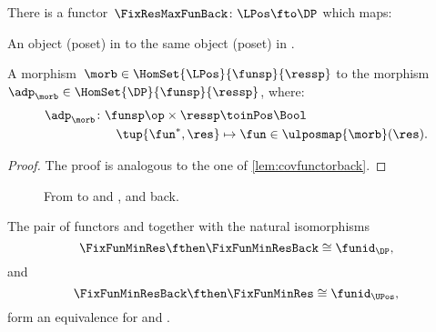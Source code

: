 \begin{lemma}
\label{lem:cofunctorback}
There is a functor~$\FixResMaxFunBack\colon \LPos \fto \DP$ which maps:
\begin{compactenum}
\item An object (poset) in \UPos to the same object (poset) in \DP.
\item A morphism~$\morb\in \HomSet{\LPos}{\funsp}{\ressp}$ to the morphism~$\adp_\morb \in \HomSet{\DP}{\funsp}{\ressp}$, where:
\begin{equation}
\begin{aligned}
    \adp_\morb\colon \funsp\op \times \ressp &\toinPos \Bool\\
    \tup{\fun^*,\res}&\mapsto \fun \in \ulposmap{\morb}(\res).
\end{aligned}
\end{equation}
\end{compactenum}
\end{lemma}

\begin{proof}
    The proof is analogous to the one of \cref{lem:covfunctorback}.
\end{proof}


\begin{figure}[tbh]
\begin{center}
\end{center}
    \caption{From \DP to \UPos and \LPos, and back.}
\end{figure}



\begin{lemma}
    The pair of functors \FixFunMinRes and \FixFunMinResBack together with the natural isomorphisms
    \begin{equation*}
        \FixFunMinRes \fthen \FixFunMinResBack \cong \funid_\DP,
    \end{equation*}
    and
     \begin{equation*}
        \FixFunMinResBack \fthen \FixFunMinRes \cong \funid_\UPos,
    \end{equation*}
    form an equivalence for \DP and \UPos.
\end{lemma}

